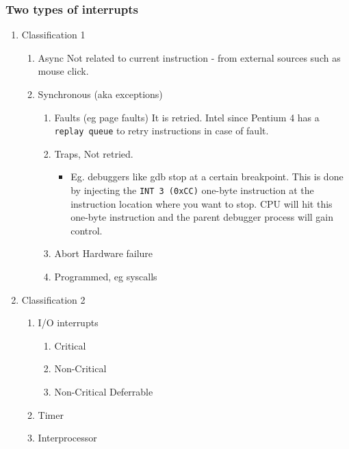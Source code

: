 \documentclass[11pt]{article}
\begin{document}
\subsubsection{Two types of interrupts}
\label{sec:org54b37e4}
\begin{enumerate}
\item Classification 1
\label{sec:orga731c2b}
\begin{enumerate}
\item Async
\label{sec:orgeeba96f}
Not related to current instruction - from external sources such as mouse click.
\item Synchronous (aka exceptions)
\label{sec:org7b1fbbc}
\begin{enumerate}
\item Faults (eg page faults)
It is retried. Intel since Pentium 4 has a \texttt{replay queue} to retry
instructions in case of fault.
\item Traps, Not retried.
\begin{itemize}
\item Eg. debuggers like gdb stop at a certain breakpoint.
This is done by injecting the \texttt{INT 3 (0xCC)} one-byte instruction at the
instruction location where you want to stop. CPU will hit this one-byte
instruction and the parent debugger process will gain control.
\end{itemize}
\item Abort
Hardware failure
\item Programmed, eg syscalls
\end{enumerate}
\end{enumerate}
\item Classification 2
\label{sec:org5c7e976}
\begin{enumerate}
\item I/O interrupts
\label{sec:org42cd3cb}
\begin{enumerate}
\item Critical
\label{sec:orgf7c3268}
\item Non-Critical
\label{sec:orgc2864c1}
\item Non-Critical Deferrable
\label{sec:org337a3e1}
\end{enumerate}
\item Timer
\label{sec:orgcdaa577}
\item Interprocessor
\label{sec:org1b3449e}
\end{enumerate}
\end{enumerate}
\end{document}
